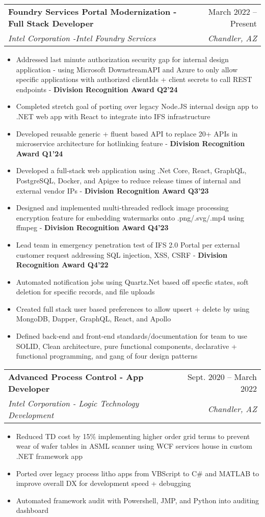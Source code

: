 \documentclass[letterpaper,11pt]{article}
\makeatletter
\newcommand{\resumeItem}[1]{
  \item\small{
    {#1 \vspace{-2pt}}
  }
}
\newcommand{\resumeSubheading}[4]{
  \vspace{-2pt}\item
    \begin{tabular*}{0.97\textwidth}[t]{l@{\extracolsep{\fill}}r}
      \textbf{#1} & #2 \\
      \textit{\small#3} & \textit{\small #4} \\
    \end{tabular*}\vspace{-7pt}
}
\newcommand{\resumeItemListStart}{\begin{itemize}}
\newcommand{\resumeItemListEnd}{\end{itemize}\vspace{-5pt}}
\makeatother
\begin{document}
    \resumeSubheading
      {Foundry Services Portal Modernization - Full Stack Developer}{March 2022 -- Present}
      {Intel Corporation -Intel Foundry Services}{Chandler, AZ}
      \resumeItemListStart
        \resumeItem{Addressed last minute authorization security gap for internal design application - using Microsoft DownstreamAPI and Azure to only allow specific applications with authorized clientIds + client secrets to call REST endpoints - \textbf{Division Recognition Award Q2'24}}
        \resumeItem{Completed stretch goal of porting over legacy Node.JS internal design app to .NET web app with React to integrate into IFS infrastructure}
        \resumeItem{Developed reusable generic + fluent based API to replace 20+ APIs in microservice architecture for hotlinking feature - \textbf{Division Recognition Award Q1'24}}
        \resumeItem{Developed a full-stack web application using .Net Core, React, GraphQL, PostgreSQL, Docker, and Apigee to reduce release times of internal and external vendor IPs - \textbf{Division Recognition Award Q3'23}}
        \resumeItem{Designed and implemented multi-threaded redlock image processing encryption feature for embedding watermarks onto .png/.svg/.mp4 using ffmpeg - \textbf{Division Recognition Award Q4'23}}
        \resumeItem{Lead team in emergency penetration test of IFS 2.0 Portal per external customer request addressing SQL injection, XSS, CSRF - \textbf{Division Recognition Award Q4'22}}
        \resumeItem{Automated notification jobs using Quartz.Net based off specfic states, soft deletion for specific records, and file uploads}
        \resumeItem{Created full stack user based preferences to allow upsert + delete by using MongoDB, Dapper, GraphQL, React, and Apollo}
        \resumeItem{Defined back-end and front-end standards/documentation for team to use SOLID, Clean architecture, pure functional components, declarative + functional programming, and gang of four design patterns} 
      \resumeItemListEnd
      

    \resumeSubheading
      {Advanced Process Control - App Developer}{Sept. 2020 -- March 2022}
      {Intel Corporation - Logic Technology Development}{Chandler, AZ}
      \resumeItemListStart
        \resumeItem{Reduced TD cost by 15\% implementing higher order grid terms to prevent wear of wafer tables in ASML scanner using WCF services house in custom .NET framework app }
        \resumeItem{Ported over legacy process litho apps from VBScript to C\# and MATLAB to improve overall DX for development speed + debugging}
        \resumeItem{Automated framework audit with Powershell, JMP, and Python into auditing dashboard}
    \resumeItemListEnd
\end{document}
